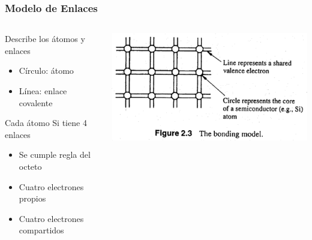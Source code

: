 \documentclass[10pt,t,aspectratio=169]{beamer}
\begin{document}
\begin{frame}[t]
  \frametitle{Modelo de Enlaces}

  \begin{columns}
  
    \begin{column}{0.5\textwidth}
    
      Describe los átomos y enlaces
      
      \begin{itemize}
        \item Círculo: átomo
        \item Línea: enlace covalente
      \end{itemize}

      \vspace{3mm}
      Cada átomo Si tiene 4 enlaces
      \begin{itemize}
        \item Se cumple regla del octeto
        \item Cuatro electrones propios
        \item Cuatro electrones compartidos
      \end{itemize}

      \vspace{3mm}
      
    \end{column}
    
    \begin{column}{0.5\textwidth}
    
      \includegraphics[width=\textwidth]{./figures/modelo-enlaces.png}
      
    \end{column}
    
  \end{columns}
  
\end{frame}
\end{document}
